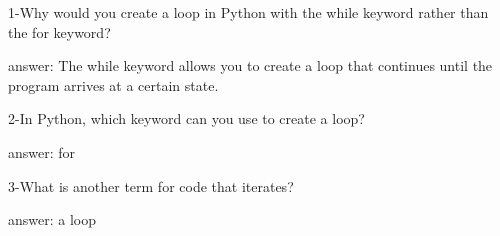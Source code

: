 1-Why would you create a loop in Python with the while keyword rather than the for keyword?

answer: The while keyword allows you to create a loop that continues until the program arrives at a certain state.

2-In Python, which keyword can you use to create a loop?

answer: for

3-What is another term for code that iterates?

answer: a loop

